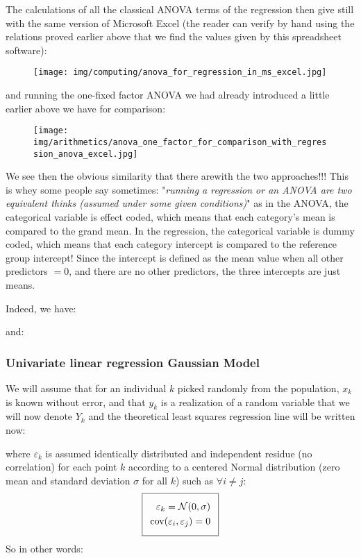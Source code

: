 	The calculations of all the classical ANOVA terms of the regression then give still with the same version of Microsoft Excel (the reader can verify by hand using the relations proved earlier above that we find the values given by this spreadsheet software):
	\begin{figure}[H]
		\centering
		\texttt{[image: img/computing/anova\_for\_regression\_in\_ms\_excel.jpg]}
	\end{figure}
	and running the one-fixed factor ANOVA we had already introduced a little earlier above we have for comparison:
	\begin{figure}[H]
		\centering
		\texttt{[image: img/arithmetics/anova\_one\_factor\_for\_comparison\_with\_regression\_anova\_excel.jpg]}
	\end{figure}
	We see then the obvious similarity that there  arewith the two approaches!!! This is whey some people say sometimes: "\textit{running a regression or an ANOVA are two equivalent thinks (assumed under some given conditions)}" as in the ANOVA, the categorical variable is effect coded, which means that each category's mean is compared to the grand mean. In the regression, the categorical variable is dummy coded, which means that each category intercept is compared to the reference group intercept! Since the intercept is defined as the mean value when all other predictors $= 0$, and there are no other predictors, the three intercepts are just means.
	
	Indeed, we have:
	
	and:
	
	
	\pagebreak
	\subsubsection{Univariate linear regression Gaussian Model}\label{univariate linear regression gaussian model}
	We will assume that for an individual $k$ picked randomly from the population, $x_k$ is known without error, and that $y_k$ is a realization of a random variable that we will now denote $Y_k$ and the theoretical least squares regression line will be written now:
	
	where $\varepsilon_k$ is assumed identically distributed and independent residue (no correlation) for each point $k$ according to a centered Normal distribution (zero mean and standard deviation $\sigma$ for all $k$) such as $\forall i\neq j$:
\begin{equation}
  \addtolength{\fboxsep}{5pt}
   \boxed{
   \begin{gathered}
		\begin{aligned}
			\varepsilon_k=\mathcal{N}(0,\sigma)\\
			\text{cov}(\varepsilon_i,\varepsilon_j)=0
		\end{aligned}
   \end{gathered}
   }
\end{equation}
	So in other words:
	
